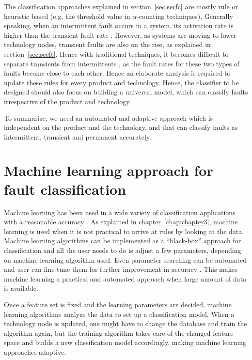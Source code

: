 The classification approaches explained in section~\ref{sec:secfc} are mostly rule or heuristic based (e.g. the threshold value in $\alpha$-counting techniques). Generally speaking, when an intermittent fault occurs in a system, its activation rate is higher than the transient fault rate \cite{Bondavalli2000}. However, as systems are moving to lower technology nodes, transient faults are also on the rise, as explained in section~\ref{sec:secft}. Hence with traditional techniques, it becomes difficult to separate transients from intermittents , as the fault rates for these two types of faults become close to each other. Hence an elaborate analysis is required to update these rules for every product and technology. Hence, the classifier to be designed should also focus on building a universal model, which can classify faults irrespective of the product and technology.

To summarize, we need an automated and adaptive approach which is independent on the product and the technology, and that can classify faults as intermittent, transient and permanent accurately. 

\section{Machine learning approach for fault classification}

Machine learning has been used in a wide variety of classification applications with a reasonable accuracy \cite{Pang2002,Nguyen2008,Sebastiani2002, Kotsiantis2007}. As explained in chapter~\ref{chap:chapter3}, machine learning is used when it is not practical to arrive at rules by looking at the data. Machine learning algorithms can be implemented as a \enquote{black-box} approach for classification and all the user needs to do is adjust a few parameters, depending on machine learning algorithm used. Even parameter searching can be automated and user can fine-tune them for further improvement in accuracy \cite{Hsu2003, Castillo2000}. This makes machine learning a practical and automated approach when large amount of data is available.

Once a feature set is fixed and the learning parameters are decided, machine learning algorithms analyze the data to set up a classification model. When a technology node is updated, one might have to change the database and train the algorithm again, but the training algorithm takes care of the changed feature space and builds a new classification model accordingly, making machine learning approaches adaptive.

